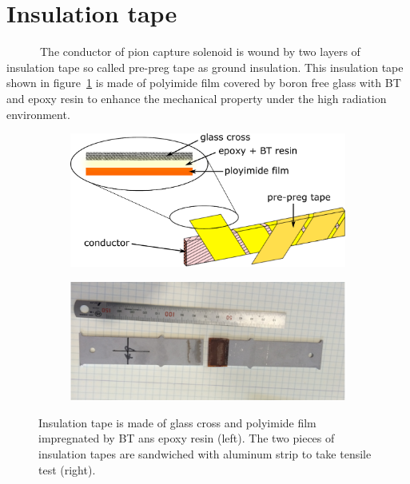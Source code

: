  \section{Insulation tape}
~~~~~~The conductor of pion capture solenoid is wound by two layers of insulation tape so called pre-preg tape as ground insulation.
This insulation tape shown in figure~\ref{3stur} is made of polyimide film covered by boron free glass with BT and epoxy resin to enhance the mechanical property under the high radiation environment.
 \begin{figure}[H]
  \begin{subfigure}{0.3\textwidth}
  \centering
  \includegraphics[scale=0.36]{chapter4/fig/prepreg.pdf}
  \label{3stur}
  \end{subfigure}
  \hspace{0.2\textwidth}
  \begin{subfigure}{0.3\textwidth}
  \centering
  \includegraphics[scale=0.31]{chapter4/fig/BUGT.pdf}
  \label{3break}
  \end{subfigure}
  \caption{Insulation tape is made of glass cross and polyimide film impregnated by BT ans epoxy resin (left). The two pieces of insulation tapes are sandwiched with aluminum strip to take tensile test (right).}
 \end{figure}

